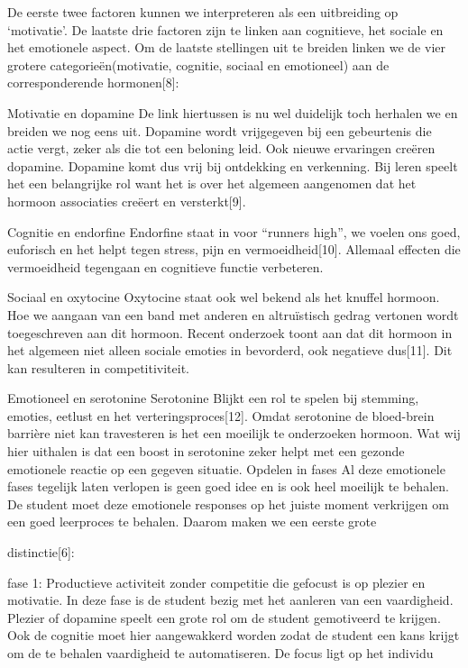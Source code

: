 \documentclass{hogent-article}
\begin{document}
De eerste twee factoren kunnen we interpreteren als een uitbreiding op ‘motivatie’. De laatste drie factoren zijn te linken aan cognitieve, het sociale en het emotionele aspect.
Om de laatste stellingen uit te breiden linken we de vier grotere categorieën(motivatie, cognitie, sociaal en emotioneel) aan de corresponderende hormonen[8]:

Motivatie en dopamine
De link hiertussen is nu wel duidelijk toch herhalen we en breiden we nog eens uit. Dopamine wordt vrijgegeven bij een gebeurtenis die actie vergt, zeker als die tot een beloning leid. Ook nieuwe ervaringen creëren dopamine. Dopamine komt dus vrij bij ontdekking en verkenning. Bij leren speelt het een belangrijke rol want het is over het algemeen aangenomen dat het hormoon associaties creëert en versterkt[9].

Cognitie en endorfine
Endorfine staat in voor “runners high”, we voelen ons goed, euforisch en het helpt tegen stress, pijn en vermoeidheid[10]. Allemaal effecten die vermoeidheid tegengaan en cognitieve functie verbeteren.

Sociaal en oxytocine
Oxytocine staat ook wel bekend als het knuffel hormoon. Hoe we aangaan van een band met anderen en altruïstisch gedrag vertonen wordt toegeschreven aan dit hormoon. Recent onderzoek toont aan dat dit hormoon in het algemeen niet alleen sociale emoties in bevorderd, ook negatieve dus[11]. Dit kan resulteren in competitiviteit.

Emotioneel en serotonine
Serotonine Blijkt een rol te spelen bij stemming, emoties, eetlust en het verteringsproces[12]. Omdat serotonine de bloed-brein barrière niet kan travesteren is het een moeilijk te onderzoeken hormoon. Wat wij hier uithalen is dat een boost in serotonine zeker helpt met een gezonde emotionele reactie op een gegeven situatie.
Opdelen in fases
Al deze emotionele fases tegelijk laten verlopen is geen goed idee en is ook heel moeilijk te behalen. De student moet deze emotionele responses op het juiste moment verkrijgen om een goed leerproces te behalen. Daarom maken we een eerste grote 

distinctie[6]:

    fase 1: Productieve activiteit zonder competitie die gefocust is op plezier en motivatie.
    In deze fase is de student bezig met het aanleren van een vaardigheid. Plezier of dopamine speelt een grote rol om de student gemotiveerd te krijgen. Ook de cognitie moet hier aangewakkerd worden zodat de student een kans krijgt om de te behalen vaardigheid te automatiseren. De focus ligt op het individu
\end{document}
